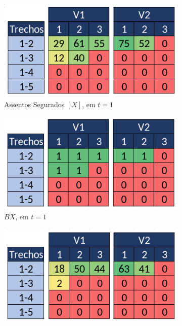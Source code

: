 \begin{figure}[h!]
	\centering
	\begin{subfigure}[b]{0.40\linewidth}
		\includegraphics[width=\linewidth]{img/assig_t1.png}
		\caption{Assentos Segurados $[X]$, em $t = 1$}
		\label{fig:assig_t1}
	\end{subfigure}\hspace{5mm}
	\begin{subfigure}[b]{0.40\linewidth}
		\includegraphics[width=\linewidth]{img/bx_t1.png}
		\caption{$BX$, em $t = 1$}
		\label{fig:BX_t1}
	\end{subfigure}
	\begin{subfigure}[b]{0.40\linewidth}
		\includegraphics[width=\linewidth]{img/assig_t0.png}

\end{subfigure}
\end{figure}
